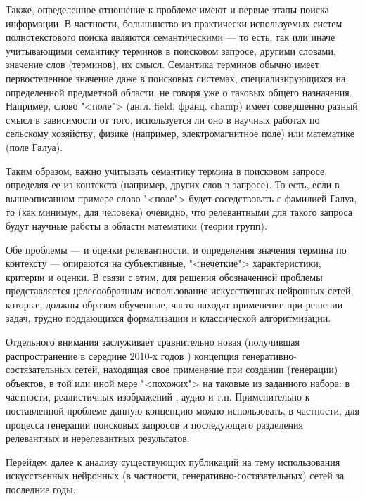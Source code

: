 Также, определенное отношение к проблеме имеют и первые этапы поиска информации. В частности, большинство
из практически используемых систем полнотекстового поиска являются семантическими --- то есть, так или иначе
учитывающими семантику терминов в поисковом запросе, другими словами, значение слов (терминов), их смысл.
Семантика терминов обычно имеет первостепенное значение даже в поисковых системах, специализирующихся
на определенной предметной области, не говоря уже о таковых общего назначения. Например, слово "<поле">
(англ. field, франц. champ) имеет совершенно разный смысл в зависимости от того, используется ли 
оно в научных работах по сельскому хозяйству, физике (например, электромагнитное поле) или математике
(поле Галуа). 

Таким образом, важно учитывать семантику термина в поисковом запросе, определяя ее из контекста (например,
других слов в запросе). То есть, если в вышеописанном примере слово "<поле"> будет соседствовать с 
фамилией Галуа, то (как минимум, для человека) очевидно, что релевантными для такого запроса будут
научные работы в области математики (теории групп).

Обе проблемы --- и оценки релевантности, и определения значения термина по контексту --- опираются
на субъективные, "<нечеткие"> характеристики, критерии и оценки. В связи с этим, для решения
обозначенной проблемы представляется целесообразным использование искусственных нейронных сетей,
которые, должны образом обученные, часто находят применение при решении задач, трудно поддающихся
формализации и классической алгоритмизации.

Отдельного внимания заслуживает сравнительно новая (получившая распространение в середине 2010-х годов
\cite{10.5555/2969033.2969125}) концепция генеративно-состязательных сетей, находящая свое применение
при создании (генерации) объектов, в той или иной мере "<похожих"> на таковые из заданного набора:
в частности, реалистичных изображений \cite{DBLP:journals/corr/abs-1809-11096, DBLP:journals/corr/abs-1812-04948},
аудио \cite{liu2020unconditional} и т.п. Применительно к поставленной проблеме данную концепцию можно 
использовать, в частности, для процесса генерации поисковых запросов и последующего разделения
релевантных и нерелевантных результатов.

Перейдем далее к анализу существующих публикаций на тему использования искусственных нейронных (в частности,
генеративно-состязательных) сетей за последние годы.